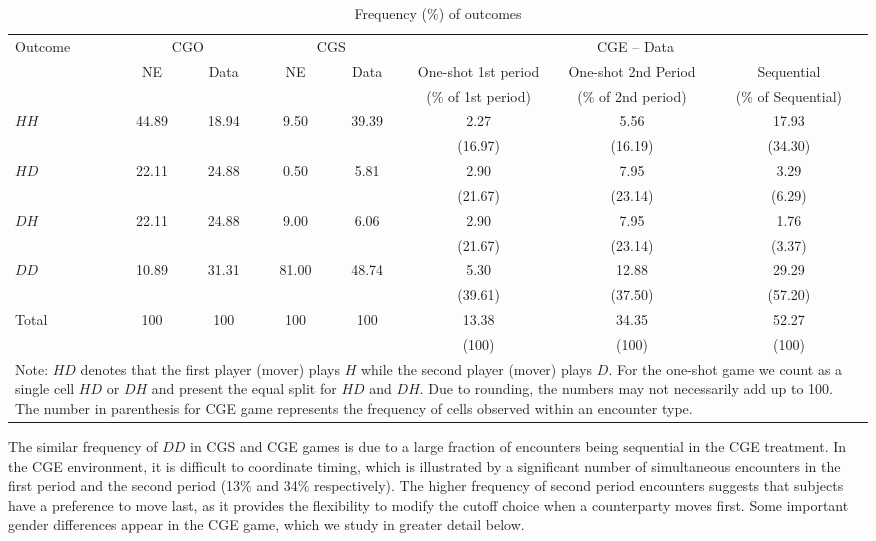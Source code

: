 \documentclass[12pt, letterpaper]{article}
\theoremstyle{plain}
\begin{document}
\begin{table}[ht]
\centering\caption{Frequency (\%) of outcomes}
\footnotesize
\begin{tabular}{lcc|cc|ccc}
\hline
Outcome & \multicolumn{2}{c|}{CGO} & \multicolumn{2}{c|}{CGS} & \multicolumn{3}{c}{CGE -- Data}\\
 & NE & Data & NE & Data & One-shot 1st period & One-shot 2nd Period & Sequential\\
  &  &  &  &  & (\% of 1st period) & (\% of 2nd period) & (\% of Sequential)\\
 \hline
$HH$ & 44.89 & 18.94 & 9.50& 39.39& 2.27  & 5.56& 17.93 \\
 &  &  & & &(16.97) & (16.19) & (34.30) \\
  $HD$ &22.11 & 24.88 & 0.50 & 5.81 & 2.90 & 7.95 & 3.29 \\
  && &  & & (21.67)&  (23.14) &  (6.29)\\
  $DH$ &22.11 & 24.88& 9.00 & 6.06 & 2.90  &7.95 & 1.76 \\
    && & &  &(21.67) & (23.14) &  (3.37)\\
  $DD$ & 10.89 & 31.31& 81.00 &48.74 & 5.30  & 12.88 & 29.29 \\
    &  & &  & & (39.61) &  (37.50)&  (57.20)\\
Total & 100 &100 &100 &100 & 13.38 & 34.35 & 52.27\\
 &  & & & &  (100)&  (100) & (100)\\
\hline   
\multicolumn{8}{p{1\textwidth}}{\scriptsize{Note: $HD$ denotes that the first player (mover) plays $H$ while the second player (mover) plays $D$. For the one-shot game we count as a single cell $HD$ or $DH$ and present the equal split for $HD$ and $DH$. Due to rounding, the numbers may not necessarily add up to 100. The number in parenthesis for CGE game represents the frequency of cells observed within an encounter type.}}\\ 
\end{tabular}
\label{tab(cells)}
\end{table}


The similar frequency of $DD$ in CGS and CGE games is due to a large fraction of encounters being sequential in the CGE treatment. In the CGE environment, it is difficult to coordinate timing, which is illustrated by a significant number of simultaneous encounters in the first period and the second period (13\% and 34\% respectively). The higher frequency of second period encounters suggests that subjects have a preference to move last, as it provides the flexibility to modify the cutoff choice when a counterparty moves first. Some important gender differences appear in the CGE game, which we study in greater detail below.\\
\end{document}
